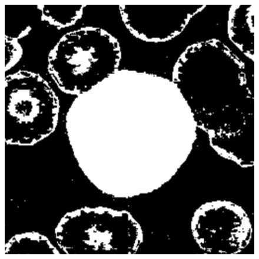 \documentclass[final,a4paper,12pt,english]{UnicaPhdThesis3}
\begin{document}
\begin{figure}[!b]
		\includegraphics[height=0.10\textheight]{images/2015_1_caip/1-3}\vspace{0.5mm}
		

\end{figure}
\end{document}
